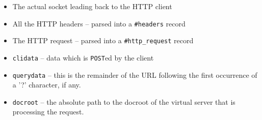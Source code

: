\documentclass[11pt,oneside,english]{book}
\begin{document}
\begin{itemize}

\item The actual socket leading back to the HTTP client
\item All the HTTP headers -- parsed into a \verb+#headers+ record
\item The HTTP request -- parsed into a \verb+#http_request+ record
\item \verb+clidata+ -- data which is \verb+POST+ed by the client
\item \verb+querydata+ -- this is the remainder of the URL following
  the first occurrence of a '?' character, if any.
\item \verb+docroot+ -- the absolute path to the docroot of the
  virtual server that is processing the request.
\end{itemize}
\end{document}
